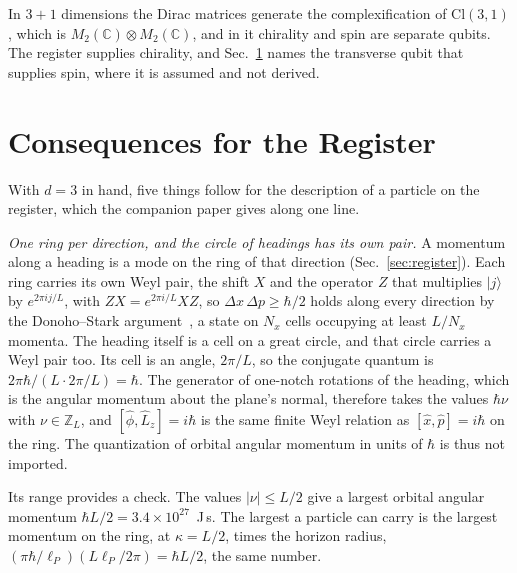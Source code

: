 \documentclass[aps,prd,twocolumn,superscriptaddress,nofootinbib]{revtex4-2}
\begin{document}
In $3+1$ dimensions the Dirac matrices generate the complexification of $\mathrm{Cl}(3,1)$, which is $M_2(\mathbb{C})\otimes M_2(\mathbb{C})$, and in it chirality and spin are separate qubits. The register supplies chirality, and Sec.~\ref{sec:consequences} names the transverse qubit that supplies spin, where it is assumed and not derived.

\section{Consequences for the Register}
\label{sec:consequences}

With $d = 3$ in hand, five things follow for the description of a particle on the register, which the companion paper gives along one line.

\textit{One ring per direction, and the circle of headings has its own pair.} A momentum along a heading is a mode on the ring of that direction (Sec.~\ref{sec:register}). Each ring carries its own Weyl pair, the shift $X$ and the operator $Z$ that multiplies $|j\rangle$ by $e^{2\pi ij/L}$, with $ZX = e^{2\pi i/L}XZ$, so $\Delta x\,\Delta p \ge \hbar/2$ holds along every direction by the Donoho--Stark argument~\cite{donoho1989,massar2008}, a state on $N_x$ cells occupying at least $L/N_x$ momenta. The heading itself is a cell on a great circle, and that circle carries a Weyl pair too. Its cell is an angle, $2\pi/L$, so the conjugate quantum is $2\pi\hbar/(L\cdot2\pi/L) = \hbar$. The generator of one-notch rotations of the heading, which is the angular momentum about the plane's normal, therefore takes the values $\hbar\nu$ with $\nu\in\mathbb{Z}_L$, and $[\hat\phi,\hat L_z] = i\hbar$ is the same finite Weyl relation as $[\hat x,\hat p] = i\hbar$ on the ring. The quantization of orbital angular momentum in units of $\hbar$ is thus not imported.

Its range provides a check. The values $|\nu| \le L/2$ give a largest orbital angular momentum $\hbar L/2 = 3.4\times10^{27}$~J\,s. The largest a particle can carry is the largest momentum on the ring, at $\kappa = L/2$, times the horizon radius, $(\pi\hbar/\ell_P)(L\ell_P/2\pi) = \hbar L/2$, the same number.
\end{document}

